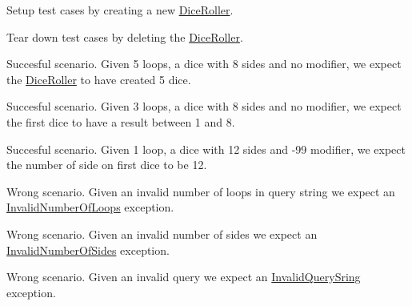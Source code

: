 
\begin{DoxyRefList}
\item[\label{test__test000013}%
\hypertarget{test__test000013}{}%
Member \hyperlink{class_test_dice_ab667ce059357171f1d8518c052e50f64}{Test\+Dice\+:\+:set\+Up} (void)]Setup test cases by creating a new \hyperlink{class_dice_roller}{Dice\+Roller}.  
\item[\label{test__test000014}%
\hypertarget{test__test000014}{}%
Member \hyperlink{class_test_dice_af92d20c1d04e258061ebba44ac109d43}{Test\+Dice\+:\+:tear\+Down} (void)]Tear down test cases by deleting the \hyperlink{class_dice_roller}{Dice\+Roller}.  
\item[\label{test__test000006}%
\hypertarget{test__test000006}{}%
Member \hyperlink{class_test_dice_a4d859f50f9c34b68557d2f78d924de65}{Test\+Dice\+:\+:test\+Dice\+Numbers} (void)]Succesful scenario. Given 5 loops, a dice with 8 sides and no modifier, we expect the \hyperlink{class_dice_roller}{Dice\+Roller} to have created 5 dice.  
\item[\label{test__test000007}%
\hypertarget{test__test000007}{}%
Member \hyperlink{class_test_dice_a6b0079bc572dd67e553f13d7015e8b0f}{Test\+Dice\+:\+:test\+Dice\+Result} (void)]Succesful scenario. Given 3 loops, a dice with 8 sides and no modifier, we expect the first dice to have a result between 1 and 8.  
\item[\label{test__test000008}%
\hypertarget{test__test000008}{}%
Member \hyperlink{class_test_dice_a205145e759d361c35ad0c5c5056a76f8}{Test\+Dice\+:\+:test\+Dice\+Side} (void)]Succesful scenario. Given 1 loop, a dice with 12 sides and -\/99 modifier, we expect the number of side on first dice to be 12.  
\item[\label{test__test000011}%
\hypertarget{test__test000011}{}%
Member \hyperlink{class_test_dice_a32c88d603100adb9592371f2e75a2f9f}{Test\+Dice\+:\+:test\+Invalid\+Number\+Of\+Loops} (void)]Wrong scenario. Given an invalid number of loops in query string we expect an \hyperlink{struct_invalid_number_of_loops}{Invalid\+Number\+Of\+Loops} exception.  
\item[\label{test__test000012}%
\hypertarget{test__test000012}{}%
Member \hyperlink{class_test_dice_a375bfdde3e13caf2116f3ca25fd7af4c}{Test\+Dice\+:\+:test\+Invalid\+Number\+Of\+Sides} (void)]Wrong scenario. Given an invalid number of sides we expect an \hyperlink{struct_invalid_number_of_sides}{Invalid\+Number\+Of\+Sides} exception.  
\item[\label{test__test000009}%
\hypertarget{test__test000009}{}%
Member \hyperlink{class_test_dice_ac550d1791d8723fb56ec25f59d5dfa51}{Test\+Dice\+:\+:test\+Invalid\+Query} (void)]Wrong scenario. Given an invalid query we expect an \hyperlink{struct_invalid_query_sring}{Invalid\+Query\+Sring} exception.  

\end{DoxyRefList}
